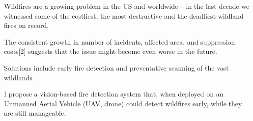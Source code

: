 Wildfires are a growing problem in the US and worldwide -- in the last decade we witnessed some of the costliest, the most destructive and the deadliest wildland fires on record.

The consistent growth in number of incidents, affected area, and suppression costs[2] suggests that the issue
might become even worse in the future.

Solutions include early fire detection and preventative scanning of the vast wildlands.

I propose a vision-based fire detection system that, when deployed on an Unmanned Aerial Vehicle (UAV, drone) could detect wildfires early,
while they are still manageable. \cite{anastasiu-dsaa2016} %